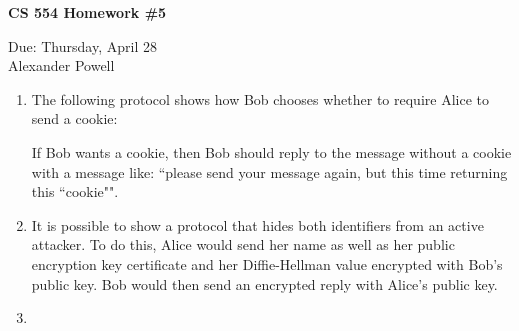 \documentclass[11pt]{article}
\begin{document}
\begin{center}             %
\begin{LARGE}
{\bf CS 554 Homework \#5}
\end{LARGE}
\vskip 0.25cm      %

Due: Thursday, April 28\\  %
Alexander Powell
\end{center}

\begin{enumerate}

\item 

The following protocol shows how Bob chooses whether to require Alice to send a cookie:

If Bob wants a cookie, then Bob should reply to the message without a cookie with a message like: ``please send your message again, but this time returning this ``cookie"".  

\item 

It is possible to show a protocol that hides both identifiers from an active attacker.  To do this, Alice would send her name as well as her public encryption key certificate and her Diffie-Hellman value encrypted with Bob's public key.  Bob would then send an encrypted reply with Alice's public key.  

\item 


\end{enumerate}
\end{document}
